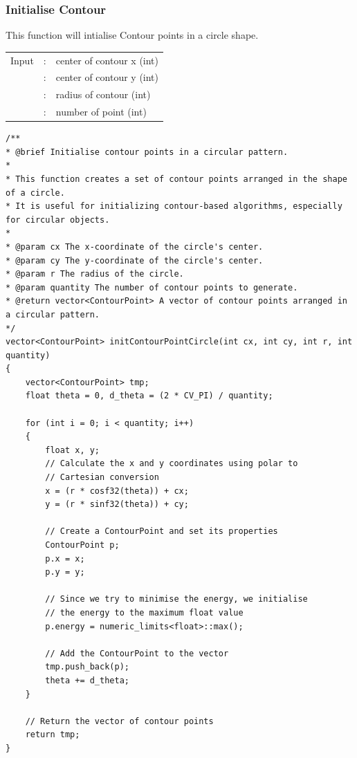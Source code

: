 \documentclass[12pt,a4paper]{report}
\begin{document}
\subsubsection{Initialise Contour}
This function will intialise Contour points in a circle shape.\\
\begin{tabular}{lll}
    Input  & : & center of contour x (int)  \\
           & : & center of contour y (int) \\
           & : & radius of contour (int) \\
           & : & number of point (int) \\
\end{tabular}
\begin{lstlisting}
/**
* @brief Initialise contour points in a circular pattern.
*
* This function creates a set of contour points arranged in the shape of a circle.
* It is useful for initializing contour-based algorithms, especially for circular objects.
*
* @param cx The x-coordinate of the circle's center.
* @param cy The y-coordinate of the circle's center.
* @param r The radius of the circle.
* @param quantity The number of contour points to generate.
* @return vector<ContourPoint> A vector of contour points arranged in a circular pattern.
*/
vector<ContourPoint> initContourPointCircle(int cx, int cy, int r, int quantity)
{
    vector<ContourPoint> tmp;
    float theta = 0, d_theta = (2 * CV_PI) / quantity;

    for (int i = 0; i < quantity; i++)
    {
        float x, y;
        // Calculate the x and y coordinates using polar to
        // Cartesian conversion
        x = (r * cosf32(theta)) + cx;
        y = (r * sinf32(theta)) + cy;

        // Create a ContourPoint and set its properties
        ContourPoint p;
        p.x = x;
        p.y = y;

        // Since we try to minimise the energy, we initialise
        // the energy to the maximum float value
        p.energy = numeric_limits<float>::max();

        // Add the ContourPoint to the vector
        tmp.push_back(p);
        theta += d_theta;
    }

    // Return the vector of contour points
    return tmp;
}
\end{lstlisting}
\end{document}
